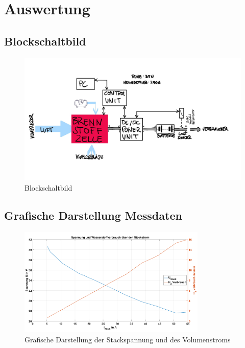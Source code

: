 \section{Auswertung}
\label{sec:Auswertung}


\subsection{Blockschaltbild}

\begin{figure}[H]
    \centering
    \includegraphics[width=\textwidth]{Abbildungen/Brennstoffzelle_Blockschaltbild.jpeg}
    \caption{Blockschaltbild}
    \label{fig:230628_Blockschaltbild}
\end{figure}


\subsection{Grafische Darstellung Messdaten}

\begin{figure}[H]
    \centering
    \includegraphics[width=0.8\textwidth]{Abbildungen/Aufgabe62_U und Vdot.png}
    \caption{Grafische Darstellung der Stackspannung und des Volumenstroms}
    \label{fig:230626_Stackspannung_Vdot}
\end{figure}

